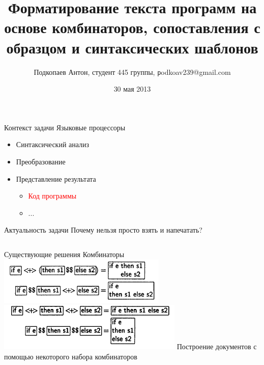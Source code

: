 \documentclass{beamer}
\begin{document}
\title
[Форматирование текста программ на основе комбинаторов, сопоставления с образцом и синтаксических шаблонов]
{Форматирование текста программ на основе комбинаторов, сопоставления с образцом и синтаксических шаблонов}
\author
[Подкопаев Антон]{Подкопаев Антон, студент 445 группы, \texttt podkoav239@gmail.com}
\date [30-05-13]{30 мая 2013}

\begin{frame}[plain]
	\titlepage
\end{frame}

\begin{frame}{Контекст задачи}
	Языковые процессоры

	\begin{block}{}
		\begin{itemize}
			\item Синтаксический анализ
			\item Преобразование
			\item Представление результата
			\begin{itemize}
				\item \textcolor{red}{Код программы}
				\item ...
			\end{itemize}
		\end{itemize}
	\end{block}

\end{frame}

\begin{frame}{Актуальность задачи}
	Почему нельзя просто взять и напечатать?
	\vspace{1cm}
	\inputminted{c}{codes/wikiExUnfor.c}
\end{frame}

\begin{frame}{Существующие решения}
	Комбинаторы
	\vspace{0.7cm}	
	\includegraphics[width = 1\linewidth]{images/a1.png}
	\includegraphics[width = 1\linewidth]{images/a2.png}
	\vspace{0.7cm}
	Построение документов с помощью некоторого набора комбинаторов
\end{frame}
\end{document}
